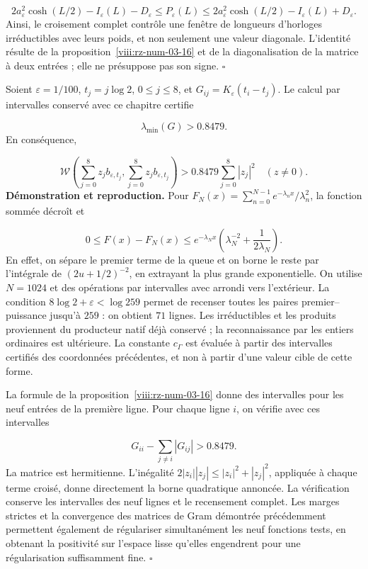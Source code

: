\[
2a_\varepsilon^2\cosh(L/2)-I_\varepsilon(L)-D_\varepsilon
\leq P_\varepsilon(L)
\leq
2a_\varepsilon^2\cosh(L/2)-I_\varepsilon(L)+D_\varepsilon.
\]
Ainsi, le croisement complet contrôle une fenêtre de longueurs d’horloges irréductibles avec leurs poids, et non seulement une valeur diagonale. L’identité résulte de la proposition~\ref{viii:rz-num-03-16} et de la diagonalisation de la matrice à deux entrées ; elle ne présuppose pas son signe. \hfill\(\square\)

Soient \(\varepsilon=1/100\), \(t_j=j\log2\), \(0\leq j\leq8\), et \(G_{ij}=K_\varepsilon(t_i-t_j)\). Le calcul par intervalles conservé avec ce chapitre certifie

\[
\lambda_{\min}(G)>0.8479.
\]
En conséquence,

\[
\mathscr W\left(\sum_{j=0}^8z_jb_{\varepsilon,t_j},
\sum_{j=0}^8z_jb_{\varepsilon,t_j}\right)
>0.8479\sum_{j=0}^8|z_j|^2
\quad(z\neq0).
\]
\textbf{Démonstration et reproduction.} Pour \(F_N(x)=\sum_{n=0}^{N-1}e^{-\lambda_nx}/\lambda_n^2\), la fonction sommée décroît et

\[
0\leq F(x)-F_N(x)
\leq e^{-\lambda_Nx}
\left(\lambda_N^{-2}+\frac1{2\lambda_N}\right).
\]
En effet, on sépare le premier terme de la queue et on borne le reste par l’intégrale de \((2u+1/2)^{-2}\), en extrayant la plus grande exponentielle. On utilise \(N=1024\) et des opérations par intervalles avec arrondi vers l’extérieur. La condition \(8\log2+\varepsilon<\log259\) permet de recenser toutes les paires premier–puissance jusqu’à \(259\) : on obtient \(71\) lignes. Les irréductibles et les produits proviennent du producteur natif déjà conservé ; la reconnaissance par les entiers ordinaires est ultérieure. La constante \(c_\Gamma\) est évaluée à partir des intervalles certifiés des coordonnées précédentes, et non à partir d’une valeur cible de cette forme.

La formule de la proposition~\ref{viii:rz-num-03-16} donne des intervalles pour les neuf entrées de la première ligne. Pour chaque ligne \(i\), on vérifie avec ces intervalles

\[
G_{ii}-\sum_{j\neq i}|G_{ij}|>0.8479.
\]
La matrice est hermitienne. L'inégalité \(2|z_i||z_j|\leq|z_i|^2+|z_j|^2\), appliquée à chaque terme croisé, donne directement la borne quadratique annoncée. La vérification conserve les intervalles des neuf lignes et le recensement complet. Les marges strictes et la convergence des matrices de Gram démontrée précédemment permettent également de régulariser simultanément les neuf fonctions tests, en obtenant la positivité sur l'espace lisse qu'elles engendrent pour une régularisation suffisamment fine. \hfill\(\square\)

